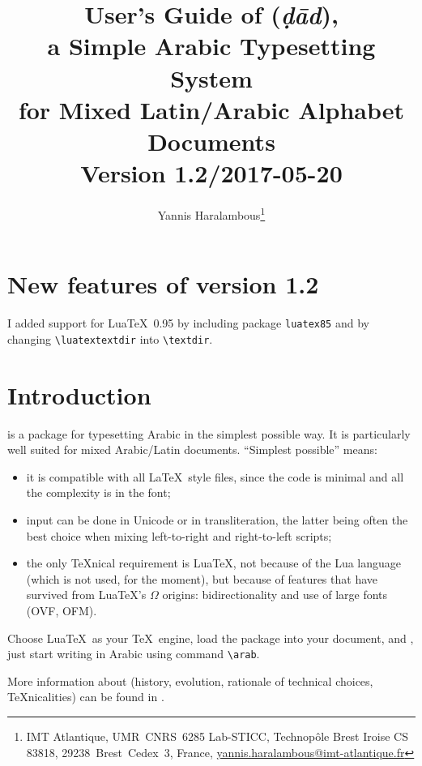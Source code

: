\documentclass[11pt,a4paper]{article}
\title{User's Guide of \arab{D} (\emph{\d{d}\=ad}),\\ a Simple Arabic Typesetting System\\ for Mixed Latin/Arabic Alphabet Documents\\[12pt]Version 1.2/2017-05-20}
\author{Yannis Haralambous\thanks{IMT Atlantique,
UMR~CNRS~6285 Lab-STICC,
Technop\^ole Brest Iroise
CS 83818, 29238~Brest~Cedex~3, France, \url{yannis.haralambous@imt-atlantique.fr}}}
\date{}
\begin{document}
\maketitle

\section*{New features of version 1.2}

I added support for Lua\TeX\ 0.95 by including package \verb=luatex85= and by changing \verb=\luatextextdir= into \verb=\textdir=.

\section{Introduction}

\noindent\mbox{} is a package for typesetting Arabic in the simplest possible way. It is particularly well suited for mixed Arabic/Latin documents. ``Simplest possible'' means:
\begin{itemize}
\item it is compatible with all \LaTeX\ style files, since the code is minimal and all the complexity is in the font;
\item input can be done in Unicode or in transliteration, the latter being often the best choice when mixing left-to-right and right-to-left scripts;
\item the only \TeX nical requirement is Lua\TeX, not because of the Lua language (which is not used, for the moment), but because of features that have survived from Lua\TeX's $\Omega$ origins: bidirectionality and use of large fonts (OVF, OFM).
\end{itemize}
Choose Lua\TeX\ as your \TeX\ engine, load the package into your document, and , just start writing in Arabic using command \verb=\arab=.

More information about  (history, evolution, rationale of technical choices, \TeX nicalities) can be found in \cite{tugboat}.

\end{document}
